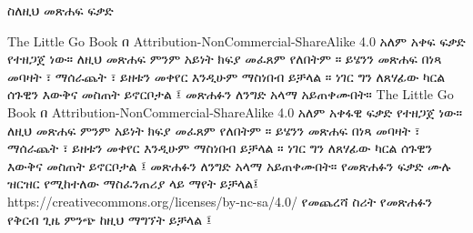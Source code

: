 \documentclass[12pt,a4paper]{report}
\begin{document}
\noindent
\huge 
ስለዚህ መጽሐፍ
\normalsize
\vskip 0.5in
\huge 
\noindent
ፍቃድ
\vskip 0.3in

\normalsize
\noindent
The Little Go Book  በ Attribution-NonCommercial-ShareAlike 4.0 አለም አቀፍ ፍቃድ የተዘጋጀ ነው። ለዚህ መጽሐፍ ምንም አይነት ክፍያ መፈጸም የለበትም ። ይሄንን መጽሐፍ በነጻ መባዛት ፣ ማሰራጨት ፣ ይዘቱን መቀየር እንዲሁም ማስነበብ ይቻላል ። ነገር ግን ለጸሃፊው ካርል ሰጉዊን እውቅና መስጠት ይኖርቦታል ፤ መጽሐፉን ለንግድ አላማ አይጠቀሙበት።
\vskip 0.3in
\noindent
The Little Go Book  በ Attribution-NonCommercial-ShareAlike 4.0 አለም አቀፋዊ ፍቃድ የተዘጋጀ ነው። ለዚህ መጽሐፍ ምንም አይነት ክፍያ መፈጸም የለበትም ። ይሄንን መጽሐፍ በነጻ መባዛት ፣ ማሰራጨት ፣ ይዘቱን መቀየር እንዲሁም ማስነበብ ይቻላል ። ነገር ግን ለጸሃፊው ካርል ሰጉዊን እውቅና መስጠት ይኖርቦታል ፤ መጽሐፉን ለንግድ አላማ አይጠቀሙበት።
የመጽሐፉን ፍቃድ ሙሉ ዝርዝር የሚከተለው ማስፈንጠሪያ ላይ ማየት ይቻላል፤
https://creativecommons.org/licenses/by-nc-sa/4.0/
\vskip 0.3in
\noindent
\huge የመጨረሻ ስሪት
\normalsize
\vskip 0.3in
\noindent
የመጽሐፉን የቅርብ ጊዜ ምንጭ ከዚህ ማግኘት ይቻላል ፤ 
\end{document}
